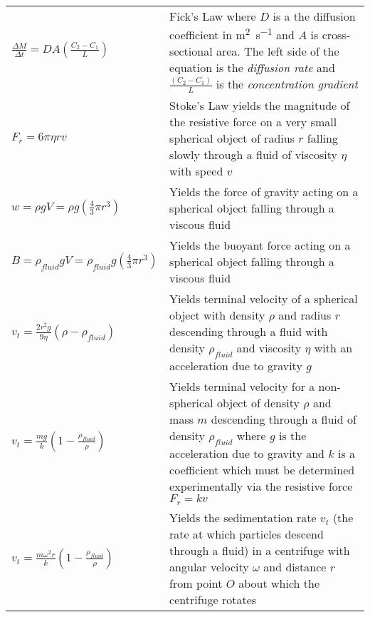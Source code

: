 \begin{longtable}{p{} p{}}
  \(\displaystyle\frac{\Delta M}{\Delta t}=DA\left(\frac{C_2-C_1}{L}\right)\) & Fick's Law where $D$ is a the diffusion coefficient in \si{\meter\squared\per\second} and $A$ is cross-sectional area. The left side of the equation is the \textit{diffusion rate} and $\frac{\left(C_2-C_1\right)}{L}$ is the \textit{concentration gradient} \\
  \(F_r = 6\pi\eta rv\) & Stoke's Law yields the magnitude of the resistive force on a very small spherical object of radius $r$ falling slowly through a fluid of viscosity $\eta$ with speed $v$ \\
  \(w = \rho gV = \rho g\displaystyle\left(\frac{4}{3}\pi r^3\right)\) & Yields the force of gravity acting on a spherical object falling through a viscous fluid \\
  \(B = \rho_{fluid}gV = \rho_{fluid}g\displaystyle\left(\frac{4}{3}\pi r^3\right)\) & Yields the buoyant force acting on a spherical object falling through a viscous fluid \\
  \(v_t = \displaystyle\frac{2r^2g}{9\eta}\left(\rho-\rho_{fluid}\right)\) & Yields terminal velocity of a spherical object with density $\rho$ and radius $r$ descending through a fluid with density $\rho_{fluid}$ and viscosity $\eta$ with an acceleration due to gravity $g$ \\
  \(v_t = \displaystyle\frac{mg}{k}\left(1-\frac{\rho_{fluid}}{\rho}\right)\) & Yields terminal velocity for a non-spherical object of density $\rho$ and mass $m$ descending through a fluid of density $\rho_{fluid}$ where $g$ is the acceleration due to gravity and $k$ is a coefficient which must be determined experimentally via the resistive force $F_r=kv$ \\
  \(v_t=\displaystyle\frac{m\omega^2r}{k}\left(1-\frac{\rho_{fluid}}{\rho}\right)\) & Yields the sedimentation rate $v_t$ (the rate at which particles descend through a fluid) in a centrifuge with angular velocity $\omega$ and distance $r$ from point $O$ about which the centrifuge rotates \\
\end{longtable}
